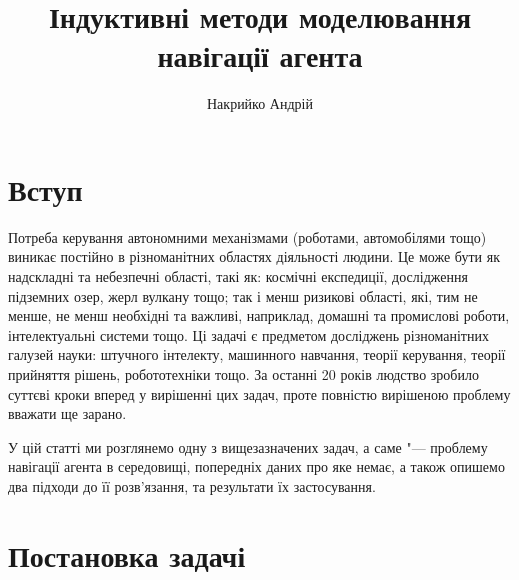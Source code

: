 \documentclass[a4paper,12pt]{article}
\title{Індуктивні методи моделювання навігації агента}
\author{Накрийко Андрій}
\begin{document}
\maketitle

\section{Вступ}

Потреба керування автономними механізмами (роботами, автомобілями тощо) виникає постійно в різноманітних областях діяльності людини. Це може бути як надскладні та небезпечні області, такі як: космічні експедиції, дослідження підземних озер, жерл вулкану тощо; так і менш ризикові області, які, тим не менше, не менш необхідні та важливі, наприклад, домашні та промислові роботи, інтелектуальні системи тощо. Ці задачі є предметом досліджень різноманітних галузей науки: штучного інтелекту, машинного навчання, теорії керування, теорії прийняття рішень, робототехніки тощо. За останні 20 років людство зробило суттєві кроки вперед у вирішенні цих задач, проте повністю вирішеною проблему вважати ще зарано.

У цій статті ми розглянемо одну з вищезазначених задач, а саме "--- проблему навігації агента в середовищі, попередніх даних про яке немає, а також опишемо два підходи до її розв'язання, та результати їх застосування.

\section{Постановка задачі}
\end{document}
